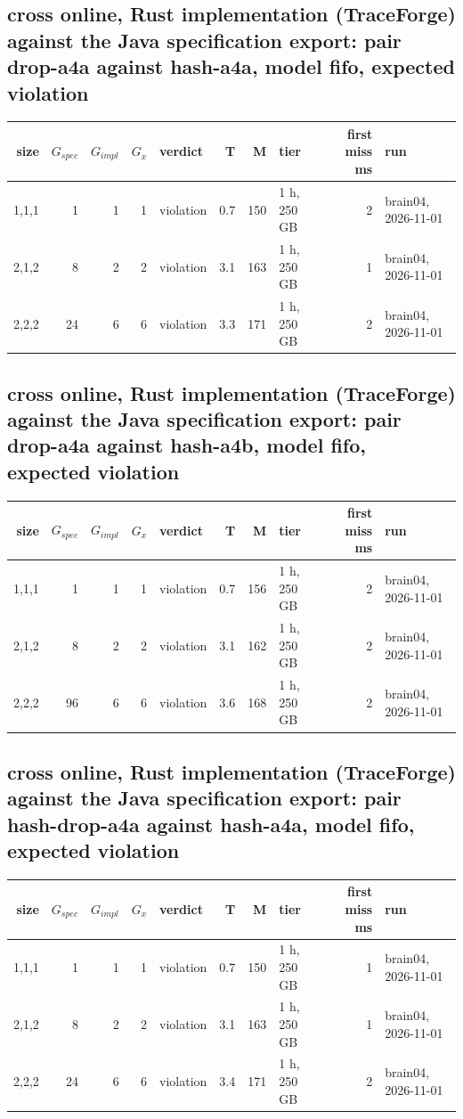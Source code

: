 \documentclass[10pt]{article}
\begin{document}
\subsection*{cross online, Rust implementation (TraceForge) against the Java specification export: pair \textsf{drop-a4a} against \textsf{hash-a4a}, model fifo, expected violation}
\begin{longtable}{@{}rrrrlrrlrl@{}}
\toprule
size & $G_{\mathit{spec}}$ & $G_{\mathit{impl}}$ & $G_x$ & verdict & T & M & tier & first miss ms & run \\
\midrule
\endhead
\color{red} 1,1,1 & 1 & 1 & 1 & violation & 0.7 & 150 & 1 h, 250 GB & 2 & brain04, 2026-11-01 \\
\color{red} 2,1,2 & 8 & 2 & 2 & violation & 3.1 & 163 & 1 h, 250 GB & 1 & brain04, 2026-11-01 \\
\color{red} 2,2,2 & 24 & 6 & 6 & violation & 3.3 & 171 & 1 h, 250 GB & 2 & brain04, 2026-11-01 \\
\bottomrule
\end{longtable}
\subsection*{cross online, Rust implementation (TraceForge) against the Java specification export: pair \textsf{drop-a4a} against \textsf{hash-a4b}, model fifo, expected violation}
\begin{longtable}{@{}rrrrlrrlrl@{}}
\toprule
size & $G_{\mathit{spec}}$ & $G_{\mathit{impl}}$ & $G_x$ & verdict & T & M & tier & first miss ms & run \\
\midrule
\endhead
\color{red} 1,1,1 & 1 & 1 & 1 & violation & 0.7 & 156 & 1 h, 250 GB & 2 & brain04, 2026-11-01 \\
\color{red} 2,1,2 & 8 & 2 & 2 & violation & 3.1 & 162 & 1 h, 250 GB & 2 & brain04, 2026-11-01 \\
\color{red} 2,2,2 & 96 & 6 & 6 & violation & 3.6 & 168 & 1 h, 250 GB & 2 & brain04, 2026-11-01 \\
\bottomrule
\end{longtable}
\subsection*{cross online, Rust implementation (TraceForge) against the Java specification export: pair \textsf{hash-drop-a4a} against \textsf{hash-a4a}, model fifo, expected violation}
\begin{longtable}{@{}rrrrlrrlrl@{}}
\toprule
size & $G_{\mathit{spec}}$ & $G_{\mathit{impl}}$ & $G_x$ & verdict & T & M & tier & first miss ms & run \\
\midrule
\endhead
\color{red} 1,1,1 & 1 & 1 & 1 & violation & 0.7 & 150 & 1 h, 250 GB & 1 & brain04, 2026-11-01 \\
\color{red} 2,1,2 & 8 & 2 & 2 & violation & 3.1 & 163 & 1 h, 250 GB & 1 & brain04, 2026-11-01 \\
\color{red} 2,2,2 & 24 & 6 & 6 & violation & 3.4 & 171 & 1 h, 250 GB & 2 & brain04, 2026-11-01 \\
\bottomrule
\end{longtable}
\end{document}
